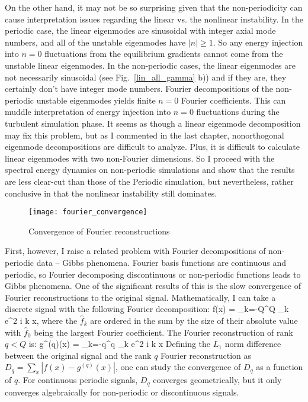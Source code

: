 On the other hand, it may not be so surprising given that the non-periodicity can cause interpretation issues regarding the linear vs. the nonlinear instability. 
In the periodic case, the linear eigenmodes are sinusoidal with integer axial mode numbers, and all of the unstable eigenmodes have $|n| \ge 1$. 
So any energy injection into $n=0$ fluctuations from the equilibrium gradients cannot come from the unstable linear eigenmodes. 
In the non-periodic cases, the linear eigenmodes are not necessarily sinusoidal (see Fig.~\ref{lin_all_gamma} b)) and if they are, they certainly don't have
integer mode numbers. Fourier decompositions of the non-periodic unstable eigenmodes yields finite $n=0$ Fourier coefficients. This can muddle interpretation of energy injection into $n=0$
fluctuations during the turbulent simulation phase. It seems as though a linear eigenmode decomposition may fix this problem, but as I commented in the last chapter, nonorthogonal eigenmode
decompositions are difficult to analyze. Plus, it is difficult to calculate linear eigenmodes with two non-Fourier dimensions. So I proceed with the spectral energy dynamics on non-periodic simulations
and show that the results are less clear-cut than those of the Periodic simulation, but nevertheless, rather conclusive in that the nonlinear instability still dominates.

\begin{figure}
\centerline{\texttt{[image: fourier\_convergence]}}
\caption{Convergence of Fourier reconstructions}
\label{fourier_convergence}
\end{figure}

First, however, I raise a related problem with Fourier decompositions of non-periodic data -- Gibbs phenomena.
Fourier basis functions are continuous and periodic, so Fourier decomposing discontinuous or non-periodic functions leads to Gibbs phenomena. 
One of the significant results of this is the slow convergence of Fourier reconstructions to the original signal.
Mathematically, I can take a discrete signal with the following Fourier decomposition:
\beq
\label{f_decomp}
f(x) = \sum_{k=-Q}^{Q} _k e^{2 \pi i k x},
\eeq
where the $\hat{f}_k$ are ordered in the sum by the size of their absolute value with $\hat{f}_0$ being the largest Fourier coefficient. The Fourier reconstruction of rank $q<Q$ is:
\beq
\label{f_recon}
g^{(q)}(x) = \sum_{k=-q}^{q} _k e^{2 \pi i k x}
\eeq
Defining the $L_1$ norm difference between the original signal and the rank $q$ Fourier reconstruction as $D_q = \sum_x |f(x) - g^{(q)}(x)|$,
one can study the convergence of $D_q$ as a function of $q$. 
For continuous periodic signals, $D_q$ converges geometrically, but it only converges algebraically for non-periodic or discontinuous signals. 

